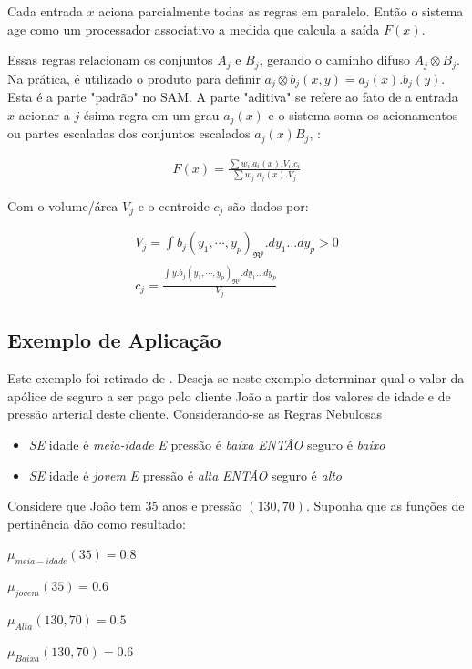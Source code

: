 Cada entrada $x$ aciona parcialmente todas as regras em paralelo. Então o sistema age como um processador 
associativo a medida que calcula a saída $F(x)$.

Essas regras relacionam os conjuntos $A_j$ e $B_j$, gerando o caminho difuso $A_j \otimes B_j$. Na prática,
é utilizado o produto para definir $ a_j \otimes b_j (x,y) = a_j(x).b_j(y)$. Esta é a parte "padrão" no SAM\@.
A parte "aditiva" se refere ao fato de a entrada $x$ acionar a $j$-ésima regra em um grau $a_j(x)$ e o sistema 
soma os acionamentos ou partes escaladas dos conjuntos escalados $a_j(x)B_j$, \cite{kosko1997fuzzy}:

\begin{eqnarray}
F(x) = \frac{\sum w_i.a_i(x).V_i.c_i}{\sum w_j.a_j(x).V_j}
\end{eqnarray}

Com o volume/área $V_j$ e o centroide $c_j$ são dados por:

\begin{eqnarray}
V_j = \int{b_j(y_1,\cdots,y_p)}_{\Re^{p}}.dy_1\dots dy_p > 0\\
c_j = \frac{\int{y.b_j(y_1,\cdots,y_p)}_{\Re^{p}}.dy_1\dots dy_p}{V_j}
\end{eqnarray}

\subsection{Exemplo de Aplicação}

Este exemplo foi retirado de \cite{passos2005datamining}. Deseja-se neste
exemplo determinar qual o valor da apólice de seguro a ser pago pelo
cliente João a partir dos valores de idade e de pressão arterial deste cliente.
Considerando-se as Regras Nebulosas
\begin{itemize}
  \item \emph{SE} idade é \textit{meia-idade} \emph{E} pressão é \textit{baixa} \emph{ENTÂO} seguro é \textit{baixo}
  \item \emph{SE} idade é \textit{jovem} \emph{E} pressão é \textit{alta} \emph{ENTÂO} seguro é \textit{alto}
\end{itemize}

Considere que João tem 35 anos e pressão $(130,70)$. Suponha que as funções de pertinência dão como resultado:
\begin{description}
  \item $\mu_{meia-idade} (35) = 0.8$
  \item $\mu_{jovem} (35) = 0.6$
  \item $\mu_{Alta}(130,70) = 0.5$
  \item $\mu_{Baixa}(130,70) = 0.6$
\end{description}


